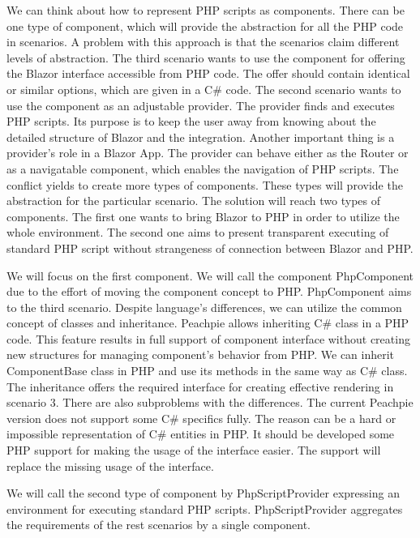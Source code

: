 \par
We can think about how to represent PHP scripts as components.
There can be one type of component, which will provide the abstraction for all the PHP code in scenarios.
A problem with this approach is that the scenarios claim different levels of abstraction.
The third scenario wants to use the component for offering the Blazor interface accessible from PHP code.
The offer should contain identical or similar options, which are given in a C\# code.
The second scenario wants to use the component as an adjustable provider.
The provider finds and executes PHP scripts.
Its purpose is to keep the user away from knowing about the detailed structure of Blazor and the integration.
Another important thing is a provider's role in a Blazor App.
The provider can behave either as the Router or as a navigatable component, which enables the navigation of PHP scripts.
The conflict yields to create more types of components.
These types will provide the abstraction for the particular scenario.
The solution will reach two types of components.
The first one wants to bring Blazor to PHP in order to utilize the whole environment.
The second one aims to present transparent executing of standard PHP script without strangeness of connection between Blazor and PHP.
\par
We will focus on the first component.
We will call the component PhpComponent due to the effort of moving the component concept to PHP.
PhpComponent aims to the third scenario.
Despite language's differences, we can utilize the common concept of classes and inheritance.
Peachpie allows inheriting C\# class in a PHP code.
This feature results in full support of component interface without creating new structures for managing component's behavior from PHP.
We can inherit ComponentBase class in PHP and use its methods in the same way as C\# class.
The inheritance offers the required interface for creating effective rendering in scenario 3.
There are also subproblems with the differences.
The current Peachpie version does not support some C\# specifics fully.
The reason can be a hard or impossible representation of C\# entities in PHP.
It should be developed some PHP support for making the usage of the interface easier.
The support will replace the missing usage of the interface.
\par
We will call the second type of component by PhpScriptProvider expressing an environment for executing standard PHP scripts.
PhpScriptProvider aggregates the requirements of the rest scenarios by a single component.
